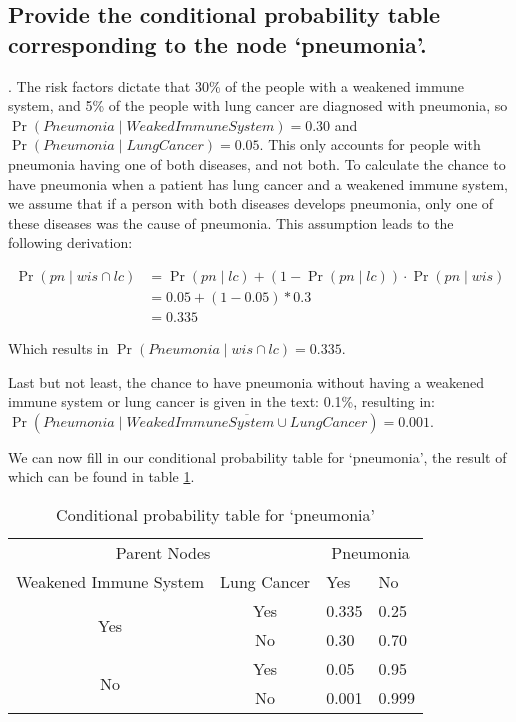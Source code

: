 \documentclass[12pt, a4paper]{article}
\begin{document}
\subsection{Provide the conditional probability table corresponding to the node `pneumonia'.}
\label{q2}.
The risk factors dictate that 30\% of the people with a weakened immune system, and 5\% of the people with lung cancer are diagnosed with pneumonia, so $\Pr(Pneumonia \mid  WeakedImmuneSystem) = 0.30$ and $\Pr(Pneumonia \mid LungCancer) = 0.05$. This only accounts for people with pneumonia having one of both diseases, and not both. To calculate the chance to have pneumonia when a patient has lung cancer and a weakened immune system, we assume that if a person with both diseases develops pneumonia, only one of these diseases was the cause of pneumonia. This assumption leads to the following derivation:

\begin{align*}
\Pr(pn \mid wis \cap lc) &= \Pr(pn \mid lc) + \left(1 - \Pr\left(pn \mid lc\right)\right) \cdot \Pr(pn \mid wis)\\
&= 0.05 + (1 - 0.05) * 0.3\\
&= 0.335
\end{align*}

Which results in $\Pr(Pneumonia \mid wis \cap lc) = 0.335$.

Last but not least, the chance to have pneumonia without having a weakened immune system or lung cancer is given in the text: 0.1\%, resulting in: \\ $\Pr\left(Pneumonia \mid \overline{WeakedImmuneSystem \cup LungCancer}\right) = 0.001$.

We can now fill in our conditional probability table for `pneumonia', the result of which can be found in table \ref{tab:pneumonia}.

\begin{table}[ht]
\centering
\caption{Conditional probability table for `pneumonia'}
\label{tab:pneumonia}
\begin{tabular}{ccll}
\toprule
\multicolumn{2}{c}{Parent Nodes}                                             & \multicolumn{2}{c}{Pneumonia} \\ \cmidrule(r){1-2} \cmidrule(l){3-4}
\multicolumn{1}{l}{Weakened Immune System} & \multicolumn{1}{l}{Lung Cancer} & Yes           & No            \\ \midrule
\multirow{2}{*}{Yes}                       & Yes                             & 0.335          & 0.25          \\ 
                                           & No                              & 0.30          & 0.70          \\ 
\multirow{2}{*}{No}                        & Yes                             & 0.05          & 0.95          \\ 
                                           & No                              & 0.001         & 0.999         \\
\bottomrule
\end{tabular}
\end{table}
\end{document}
